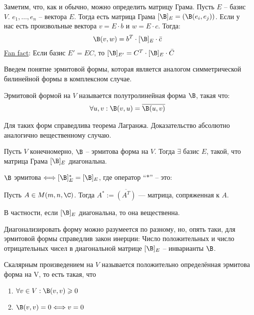 Заметим, что, как и обычно, можно определить матрицу Грама. 
Пусть $E$ -- базис $V$. $e_1, \dots, e_n$ -- вектора $E$. Тогда есть матрица Грама $[\B]_E = (\B(e_i, e_j))$. 
Если у нас есть произвольные вектора $v = E \cdot b$ и $w = E \cdot c$. Тогда: 
\begin{gather*}
    \B(v, w) = b^T \cdot [\B]_E \cdot \bar{c}
\end{gather*}
\underline{Fan fact}:
Если базис $E' = EC$, то $[\B]_{E'} = C^T \cdot [\B]_{E} \cdot \bar{C}$

Введем понятие эрмитовой формы, которая является аналогом симметрической билинейной формы в комплексном случае. 
\begin{conj}
    Эрмитовой формой на $V$ называется полутролинейная форма $\B$, такая что:  
    \begin{gather*}
        \forall u, v: \B(v, u) = \overline{\B(u, v)}
    \end{gather*}
\end{conj}
Для таких форм справедлива теорема Лагранжа. Доказательство абсолютно аналогично вещественному случаю. 
\begin{theorem}
    Пусть $V$ конечномерно, $\B$ --  эрмитова форма на $V$. Тогда $\exists$ базис $E$, такой, что матрица Грама $[\B]_E$ диагональна.
\end{theorem}

\notice $\B$ эрмитова $\Longleftrightarrow [\B]^*_E  = [\B]_E$, где оператор ``$*$'' -- это: 
\begin{conj}
    Пусть $A \in M(m, n, \C)$. Тогда $A^* := \overline{(A^T)}$ --- матрица, сопряженная к $A$.
\end{conj}
В частности, если $[\B]_E$ диагональна, то она вещественна.

Диагонализировать форму можно разумеется по разному, но, опять таки, для эрмитовой формы справедлив закон инерции:
Число положительных и число отрицательных чисел в диагональной матрице $[\B]_E$ -- инварианты $\B$.

\begin{conj}
    Скалярным произведением на $V$ называется положительно определённая эрмитова форма на V, то есть такая, что
    \begin{enumerate}
        \item $\forall v \in V: \B(v, v) \geqslant 0$
        \item $\B(v, v) = 0 \Longleftrightarrow v = 0$
    \end{enumerate}
\end{conj}

